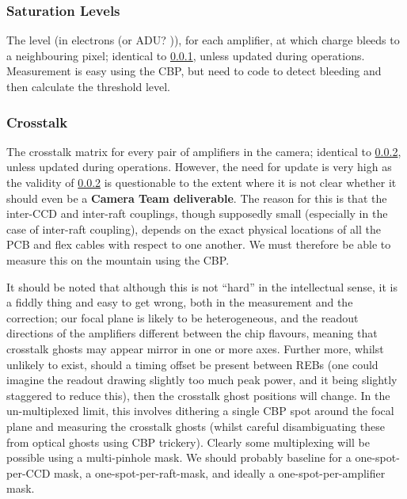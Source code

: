 \subsubsection{Saturation Levels}\label{calibProducts:saturationLevel}
The level (in electrons (or ADU? \xxx)), for each amplifier, at which charge bleeds to a neighbouring pixel; identical to \ref{calibProducts:saturationLevel}, unless updated during operations.
\alg Measurement is easy using the CBP, but need to code to detect bleeding and then calculate the threshold level. 


\subsubsection{Crosstalk}\label{calibProducts:crosstalk}
The crosstalk matrix for every pair of amplifiers in the camera; identical to \ref{calibProducts:crosstalk}, unless updated during operations. However, the need for update is very high as the validity of \ref{calibProducts:crosstalk} is questionable to the extent where it is not clear whether it should even be a \textbf{Camera Team deliverable}. The reason for this is that the inter-CCD and inter-raft couplings, though supposedly small (especially in the case of inter-raft coupling), depends on the exact physical locations of all the PCB and flex cables with respect to one another. We must therefore be able to measure this on the mountain using the CBP.

It should be noted that although this is not ``hard'' in the intellectual sense, it is a fiddly thing and easy to get wrong, both in the measurement and the correction; our focal plane is likely to be heterogeneous, and the readout directions of the amplifiers different between the chip flavours, meaning that crosstalk ghosts may appear mirror in one or more axes. Further more, whilst unlikely to exist, should a timing offset be present between REBs (one could imagine the readout drawing slightly too much peak power, and it being slightly staggered to reduce this), then the crosstalk ghost positions will change.
\alg In the un-multiplexed limit, this involves dithering a single CBP spot around the focal plane and measuring the crosstalk ghosts (whilst careful disambiguating these from optical ghosts using CBP trickery). Clearly some multiplexing will be possible using a multi-pinhole mask. We should probably baseline for a one-spot-per-CCD mask, a one-spot-per-raft-mask, and ideally a one-spot-per-amplifier mask.

